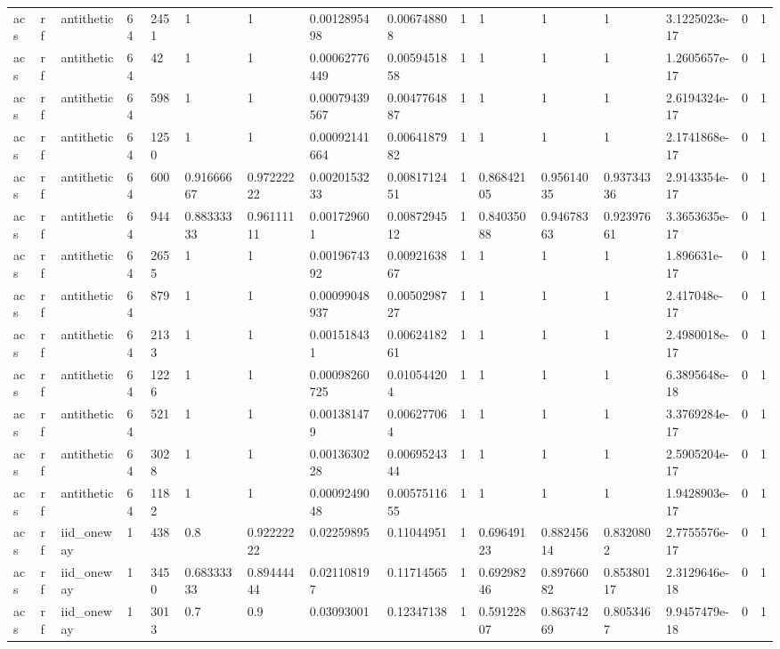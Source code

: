 \begin{tabular}{llllllllllllllll}
acs & rf & antithetic & 64 & 2451 & 1 & 1 & 0.0012895498 & 0.006748808 & 1 & 1 & 1 & 1 & 3.1225023e-17 & 0 & 1 \\
acs & rf & antithetic & 64 & 42 & 1 & 1 & 0.00062776449 & 0.0059451858 & 1 & 1 & 1 & 1 & 1.2605657e-17 & 0 & 1 \\
acs & rf & antithetic & 64 & 598 & 1 & 1 & 0.00079439567 & 0.0047764887 & 1 & 1 & 1 & 1 & 2.6194324e-17 & 0 & 1 \\
acs & rf & antithetic & 64 & 1250 & 1 & 1 & 0.00092141664 & 0.0064187982 & 1 & 1 & 1 & 1 & 2.1741868e-17 & 0 & 1 \\
acs & rf & antithetic & 64 & 600 & 0.91666667 & 0.97222222 & 0.0020153233 & 0.0081712451 & 1 & 0.86842105 & 0.95614035 & 0.93734336 & 2.9143354e-17 & 0 & 1 \\
acs & rf & antithetic & 64 & 944 & 0.88333333 & 0.96111111 & 0.001729601 & 0.0087294512 & 1 & 0.84035088 & 0.94678363 & 0.92397661 & 3.3653635e-17 & 0 & 1 \\
acs & rf & antithetic & 64 & 2655 & 1 & 1 & 0.0019674392 & 0.0092163867 & 1 & 1 & 1 & 1 & 1.896631e-17 & 0 & 1 \\
acs & rf & antithetic & 64 & 879 & 1 & 1 & 0.00099048937 & 0.0050298727 & 1 & 1 & 1 & 1 & 2.417048e-17 & 0 & 1 \\
acs & rf & antithetic & 64 & 2133 & 1 & 1 & 0.001518431 & 0.0062418261 & 1 & 1 & 1 & 1 & 2.4980018e-17 & 0 & 1 \\
acs & rf & antithetic & 64 & 1226 & 1 & 1 & 0.00098260725 & 0.010544204 & 1 & 1 & 1 & 1 & 6.3895648e-18 & 0 & 1 \\
acs & rf & antithetic & 64 & 521 & 1 & 1 & 0.001381479 & 0.006277064 & 1 & 1 & 1 & 1 & 3.3769284e-17 & 0 & 1 \\
acs & rf & antithetic & 64 & 3028 & 1 & 1 & 0.0013630228 & 0.0069524344 & 1 & 1 & 1 & 1 & 2.5905204e-17 & 0 & 1 \\
acs & rf & antithetic & 64 & 1182 & 1 & 1 & 0.0009249048 & 0.0057511655 & 1 & 1 & 1 & 1 & 1.9428903e-17 & 0 & 1 \\
acs & rf & iid\_oneway & 1 & 438 & 0.8 & 0.92222222 & 0.02259895 & 0.11044951 & 1 & 0.69649123 & 0.88245614 & 0.8320802 & 2.7755576e-17 & 0 & 1 \\
acs & rf & iid\_oneway & 1 & 3450 & 0.68333333 & 0.89444444 & 0.021108197 & 0.11714565 & 1 & 0.69298246 & 0.89766082 & 0.85380117 & 2.3129646e-18 & 0 & 1 \\
acs & rf & iid\_oneway & 1 & 3013 & 0.7 & 0.9 & 0.03093001 & 0.12347138 & 1 & 0.59122807 & 0.86374269 & 0.8053467 & 9.9457479e-18 & 0 & 1 \\

\end{tabular}
